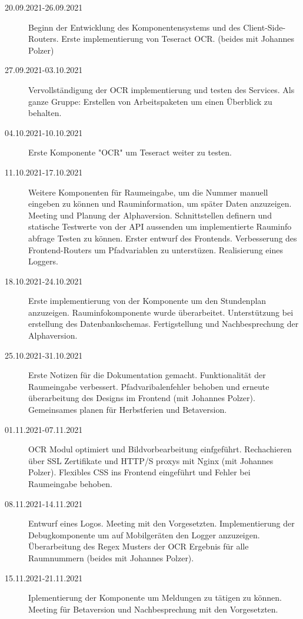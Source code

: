 
\begin{description}
    \item[20.09.2021-26.09.2021]Beginn der Entwicklung des Komponentensystems und des Client-Side-Routers. Erste implementierung von Teseract OCR. (beides mit Johannes Polzer)
    \item[27.09.2021-03.10.2021] Vervollständigung der OCR implementierung und testen des Services. Als ganze Gruppe: Erstellen von Arbeitspaketen um einen Überblick zu behalten.
    \item[04.10.2021-10.10.2021] Erste Komponente "OCR" um Teseract weiter zu testen.
    \item[11.10.2021-17.10.2021] Weitere Komponenten für Raumeingabe, um die Nummer manuell eingeben zu können und Rauminformation, um später Daten anzuzeigen. Meeting und Planung der Alphaversion. Schnittstellen definern und statische Testwerte von der API aussenden um implementierte Rauminfo abfrage Testen zu können. Erster entwurf des Frontends. Verbesserung des Frontend-Routers um Pfadvariablen zu unterstüzen. Realisierung eines Loggers.
    \item[18.10.2021-24.10.2021] Erste implementierung von der Komponente um den Stundenplan anzuzeigen. Rauminfokomponente wurde überarbeitet. Unterstützung bei erstellung des Datenbankschemas. Fertigstellung und Nachbesprechung der Alphaversion.
    \item[25.10.2021-31.10.2021] Erste Notizen für die Dokumentation gemacht. Funktionalität der Raumeingabe verbessert. Pfadvaribalenfehler behoben und erneute überarbeitung des Designs im Frontend (mit Johannes Polzer). Gemeinsames planen für Herbstferien und Betaversion.
    \item[01.11.2021-07.11.2021] OCR Modul optimiert und Bildvorbearbeitung einfgeführt. Rechachieren über SSL Zertifikate und HTTP/S proxys mit Nginx (mit Johannes Polzer). Flexibles CSS ins Frontend eingeführt und Fehler bei Raumeingabe behoben.
    \item[08.11.2021-14.11.2021] Entwurf eines Logos. Meeting mit den Vorgesetzten. Implementierung der Debugkomponente um auf Mobilgeräten den Logger anzuzeigen. Überarbeitung des Regex Musters der OCR Ergebnis für alle Raumnummern (beides mit Johannes Polzer).
    \item[15.11.2021-21.11.2021] Iplementierung der Komponente um Meldungen zu tätigen zu können. Meeting für Betaversion und Nachbesprechung mit den Vorgesetzten. 

\end{description}
